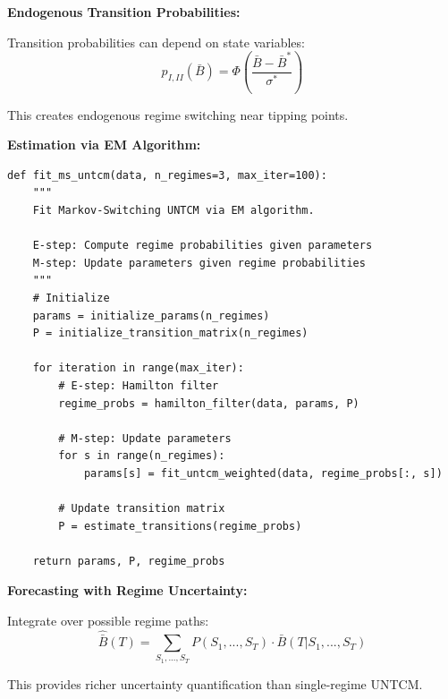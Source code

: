 \begin{tcolorbox}[colback=red!5!white, colframe=red!75!black,
    title=\textbf{Extension UNTCM-X4: Markov-Switching UNTCM}]
\textbf{Endogenous Transition Probabilities:}

Transition probabilities can depend on state variables:
\begin{equation}
p_{I,II}(\bar{B}) = \Phi\left( \frac{\bar{B} - \bar{B}^*}{\sigma^*} \right)
\end{equation}

This creates endogenous regime switching near tipping points.

\textbf{Estimation via EM Algorithm:}

\begin{verbatim}
def fit_ms_untcm(data, n_regimes=3, max_iter=100):
    """
    Fit Markov-Switching UNTCM via EM algorithm.

    E-step: Compute regime probabilities given parameters
    M-step: Update parameters given regime probabilities
    """
    # Initialize
    params = initialize_params(n_regimes)
    P = initialize_transition_matrix(n_regimes)

    for iteration in range(max_iter):
        # E-step: Hamilton filter
        regime_probs = hamilton_filter(data, params, P)

        # M-step: Update parameters
        for s in range(n_regimes):
            params[s] = fit_untcm_weighted(data, regime_probs[:, s])

        # Update transition matrix
        P = estimate_transitions(regime_probs)

    return params, P, regime_probs
\end{verbatim}

\textbf{Forecasting with Regime Uncertainty:}

Integrate over possible regime paths:
\begin{equation}
\hat{\bar{B}}(T) = \sum_{S_1, ..., S_T} P(S_1, ..., S_T) \cdot \bar{B}(T | S_1, ..., S_T)
\end{equation}

This provides richer uncertainty quantification than single-regime UNTCM.

\end{tcolorbox}


